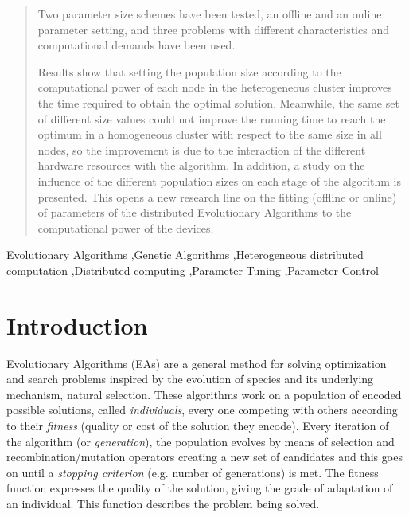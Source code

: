\documentclass[final,1p,times]{elsarticle}
\begin{document}
\begin{frontmatter}
\begin{abstract}
Two  parameter size schemes have been tested, an offline and an online parameter setting, and three 
problems with different characteristics and computational demands have
been used. 

Results show
that setting the population size according to the computational power
of each node in the heterogeneous cluster improves the time required
to obtain the optimal solution. 
Meanwhile, the same set of
different size values could not improve the running time  to reach the optimum 
 in a homogeneous
cluster with respect to the same size in all nodes, so the improvement is due to the interaction of the different hardware
resources with the algorithm. In addition, a study on the influence of
the different population sizes on each stage of the algorithm is
presented. This opens a new research line on the fitting (offline
or online) of parameters of the distributed Evolutionary Algorithms to the computational power of the devices.





 
\end{abstract}

\begin{keyword}

Evolutionary Algorithms \sep Genetic Algorithms \sep Heterogeneous distributed computation \sep Distributed computing \sep Parameter Tuning \sep Parameter Control

\end{keyword}

\end{frontmatter}

\section{Introduction}
\label{sec:intro}



Evolutionary Algorithms (EAs) are a general method for solving
optimization and search problems inspired by the evolution of species
and its underlying mechanism, natural selection. These algorithms work
on a population of encoded
possible solutions, called {\em individuals}, every one competing with others according to their
{\em fitness} (quality or cost of the solution they encode). Every iteration of the algorithm (or {\em generation}), the
population evolves by means of selection and recombination/mutation operators 
creating a new set of candidates and this goes on until a {\em stopping criterion}
(e.g. number of generations) is met. The fitness function expresses
the quality of the solution, giving the grade of adaptation of an
individual. This function describes the problem being
solved. 
\end{document}
